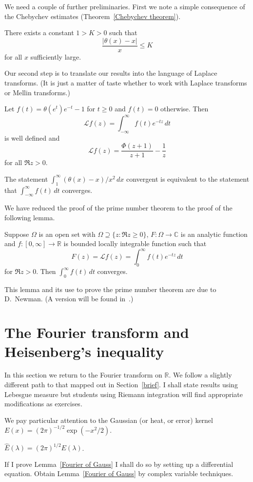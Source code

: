 We need a couple of further preliminaries.
First we note a simple consequence of the Chebychev
estimates (Theorem~\ref{Chebychev theorem}).
\begin{lemma} There exists a constant $1>K>0$
such that
\[\frac{|\theta(x)-x|}{x}\leq K\]
for all $x$ sufficiently large.
\end{lemma}
Our second step is to translate our results into
the language of Laplace transforms. (It is
just a matter of taste whether to work with Laplace
transforms or Mellin transforms.)
\begin{lemma} Let $f(t)=\theta(e^{t})e^{-t}-1$ for
$t\geq 0$ and $f(t)=0$ otherwise. Then
\[\mathcal{L}f(z)=\int_{-\infty}^{\infty}f(t)e^{-tz}\,dt\]
is well defined and
\[\mathcal{L}f(z)=\frac{\Phi(z+1)}{z+1}-\frac{1}{z}\]
for all $\Re z>0$.

The statement $\int_{1}^{\infty}(\theta(x)-x)/x^{2}\,dx$
convergent is equivalent to the statement that
$\int_{-\infty}^{\infty}f(t)\,dt$ converges.
\end{lemma}

We have reduced the proof of the prime number theorem
to the proof of the following lemma.
\begin{lemma} Suppose $\Omega$ is an open set
with $\Omega\supseteq \{z:\Re z\geq 0\}$,
$F:\Omega\rightarrow{\mathbb C}$  is an analytic
function and $f:[0,\infty]\rightarrow{\mathbb R}$
is bounded locally integrable function such that
\[F(z)=\mathcal{L}f(z)=\int_{0}^{\infty}f(t)e^{-tz}\,dt\]
for $\Re z>0$. Then $\int_{0}^{\infty}f(t)\,dt$ converges.
\end{lemma}
This lemma and its use to prove the prime number theorem
are due to D.~Newman. (A version will be found in~\cite{Newman}.)
\section{The Fourier transform and Heisenberg's inequality}%
\label{Heisenberg section} In this section we return to the
Fourier transform on ${\mathbb R}$. We follow a slightly
different path to that mapped out in Section~\ref{brief}.
I shall state results using Lebesgue measure but
students using Riemann integration will find appropriate
modifications as exercises.

We pay particular attention to the Gaussian (or heat, or error)
kernel $E(x)=(2\pi)^{-1/2}\exp(-x^{2}/2)$.
\begin{lemma}\label{Fourier of Gauss}
$\hat{E}(\lambda)=(2\pi)^{1/2}E(\lambda)$.
\end{lemma}
\begin{exercise} If I prove Lemma~\ref{Fourier of Gauss}
I shall do so by setting up a differential equation.
Obtain Lemma~\ref{Fourier of Gauss}  by complex variable
techniques.
\end{exercise}

